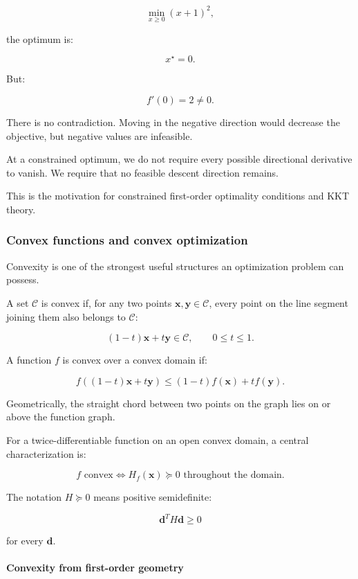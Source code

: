 \[
\min_{x\ge0}(x+1)^2,
\]

the optimum is:

\[
x^\star=0.
\]

But:

\[
f'(0)=2\ne0.
\]

There is no contradiction. Moving in the negative direction would decrease the objective, but negative values are infeasible.

At a constrained optimum, we do not require every possible directional derivative to vanish. We require that no feasible descent direction remains.

This is the motivation for constrained first-order optimality conditions and KKT theory.

\subsubsection{Convex functions and convex optimization}\label{02-foundations-ii-ch026-convex-functions-and-convex-optimization}

Convexity is one of the strongest useful structures an optimization problem can possess.

A set \(\mathcal C\) is convex if, for any two points \(\mathbf x,\mathbf y\in\mathcal C\), every point on the line segment joining them also belongs to \(\mathcal C\):

\[
(1-t)\mathbf x+t\mathbf y\in\mathcal C, \qquad 0\le t\le1.
\]

A function \(f\) is convex over a convex domain if:

\[
\boxed{ f((1-t)\mathbf x+t\mathbf y) \le (1-t)f(\mathbf x)+tf(\mathbf y) }.
\]

Geometrically, the straight chord between two points on the graph lies on or above the function graph.

For a twice-differentiable function on an open convex domain, a central characterization is:

\[
\boxed{ f\text{ convex} \iff H_f(\mathbf x)\succeq0 \text{ throughout the domain} }.
\]

The notation \(H\succeq0\) means positive semidefinite:

\[
\mathbf d^TH\mathbf d\ge0
\]

for every \(\mathbf d\).

\paragraph{Convexity from first-order geometry}\label{02-foundations-ii-ch026-convexity-from-first-order-geometry}

